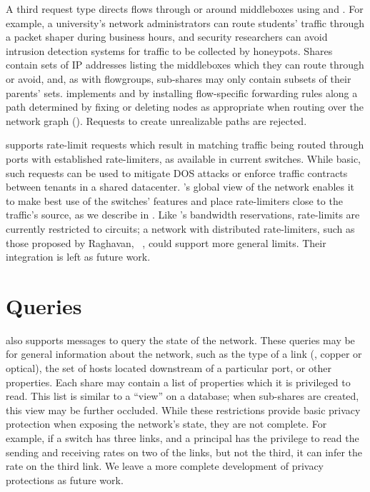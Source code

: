 A third request type directs flows through or around middleboxes using
 and .
For example, a university's network administrators can
route students' traffic through a packet shaper during business hours,
and security researchers can avoid intrusion detection systems for traffic to be collected by honeypots.
Shares contain sets of IP addresses listing the middleboxes which
they can route through or avoid, and, as with flowgroups, sub-shares may
only contain subsets of their parents' sets.
\sys implements  and  by installing flow-specific
forwarding rules along a path determined by
fixing or deleting nodes as appropriate when routing over the network graph
(). Requests to create unrealizable paths are rejected.

\sys supports rate-limit requests which result in matching traffic 
being routed through
ports with established rate-limiters, as available in current switches.
While basic, such requests can be used to mitigate DOS attacks or
enforce traffic contracts between tenants in a shared datacenter.
\sys's global view of the network enables it to make best use of the switches'
features and place rate-limiters close to the traffic's source, as we describe in .
Like \sys's bandwidth reservations, rate-limits are currently restricted to circuits;
a network with distributed rate-limiters, such as those proposed
by Raghavan, \etal~\cite{Raghavan:2007}, could support more general limits.
Their integration is left as future work.

\section{Queries}
\label{sec:Queries}

\sys also supports messages to query the state of the network.
These queries may be for general information about the network,
such as the type of a link (\eg, copper or optical), the set of hosts
located downstream of a particular port, or other properties.
Each share may contain a list of properties which it is privileged
to read. This list is similar to a ``view'' on a database; when sub-shares
are created, this view may be further occluded. While these restrictions
provide basic privacy protection when exposing the network's state,
they are not complete. For example, if a switch has three links, and
a principal has the privilege to read the sending and receiving rates
on two of the links, but not the third, it can infer the rate on the third link.
We leave a more complete development of privacy protections as
future work.

